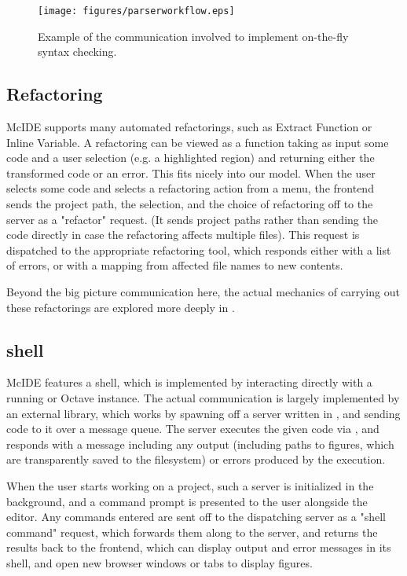 \begin{figure}
\centering
\texttt{[image: figures/parserworkflow.eps]}
\caption{Example of the communication involved to implement on-the-fly syntax
checking.}
\label{fig:ParserWorkflow}
\end{figure}

\subsection{Refactoring}

McIDE supports many automated refactorings, such as Extract Function or Inline
Variable. A refactoring can be viewed as a function taking as input some code
and a user selection (e.g. a highlighted region) and returning either the
transformed code or an error. This fits nicely into our model. When the user
selects some code and selects a refactoring action from a menu, the frontend
sends the project path, the selection, and the choice of refactoring off to the
server as a "refactor" request. (It sends project paths rather than sending the
code directly in case the refactoring affects multiple files). This request is
dispatched to the appropriate refactoring tool, which responds either with a
list of errors, or with a mapping from affected file names to new contents.

Beyond the big picture communication here, the actual mechanics of carrying out
these refactorings are explored more deeply in
.

\subsection{\matlab shell}

McIDE features a \matlab shell, which is implemented by interacting directly
with a running \matlab or Octave instance. The actual communication is largely
implemented by an external library, which works by spawning off a server
written in \matlab, and sending code to it over a message queue. The server
executes the given code via , and responds with a message including
any output (including paths to figures, which are transparently saved to the
filesystem) or errors produced by the execution.

When the user starts working on a project, such a \matlab server is initialized
in the background, and a command prompt is presented to the user alongside the
editor. Any commands entered are sent off to the dispatching server as a "shell
command" request, which forwards them along to the \matlab server, and returns
the results back to the frontend, which can display output and error messages
in its shell, and open new browser windows or tabs to display figures.

